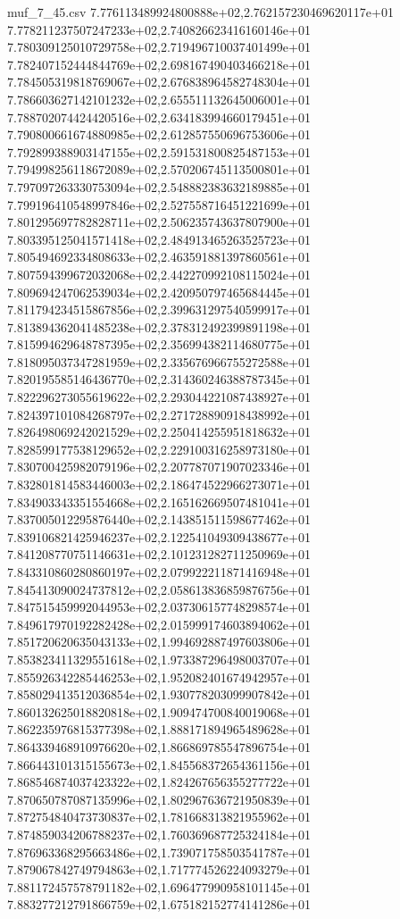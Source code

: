 \begin{filecontents*}{muf_7_45.csv}
7.776113489924800888e+02,2.762157230469620117e+01
7.778211237507247233e+02,2.740826623416160146e+01
7.780309125010729758e+02,2.719496710037401499e+01
7.782407152444844769e+02,2.698167490403466218e+01
7.784505319818769067e+02,2.676838964582748304e+01
7.786603627142101232e+02,2.655511132645006001e+01
7.788702074424420516e+02,2.634183994660179451e+01
7.790800661674880985e+02,2.612857550696753606e+01
7.792899388903147155e+02,2.591531800825487153e+01
7.794998256118672089e+02,2.570206745113500801e+01
7.797097263330753094e+02,2.548882383632189885e+01
7.799196410548997846e+02,2.527558716451221699e+01
7.801295697782828711e+02,2.506235743637807900e+01
7.803395125041571418e+02,2.484913465263525723e+01
7.805494692334808633e+02,2.463591881397860561e+01
7.807594399672032068e+02,2.442270992108115024e+01
7.809694247062539034e+02,2.420950797465684445e+01
7.811794234515867856e+02,2.399631297540599917e+01
7.813894362041485238e+02,2.378312492399891198e+01
7.815994629648787395e+02,2.356994382114680775e+01
7.818095037347281959e+02,2.335676966755272588e+01
7.820195585146436770e+02,2.314360246388787345e+01
7.822296273055619622e+02,2.293044221087438927e+01
7.824397101084268797e+02,2.271728890918438992e+01
7.826498069242021529e+02,2.250414255951818632e+01
7.828599177538129652e+02,2.229100316258973180e+01
7.830700425982079196e+02,2.207787071907023346e+01
7.832801814583446003e+02,2.186474522966273071e+01
7.834903343351554668e+02,2.165162669507481041e+01
7.837005012295876440e+02,2.143851511598677462e+01
7.839106821425946237e+02,2.122541049309438677e+01
7.841208770751146631e+02,2.101231282711250969e+01
7.843310860280860197e+02,2.079922211871416948e+01
7.845413090024737812e+02,2.058613836859876756e+01
7.847515459992044953e+02,2.037306157748298574e+01
7.849617970192282428e+02,2.015999174603894062e+01
7.851720620635043133e+02,1.994692887497603806e+01
7.853823411329551618e+02,1.973387296498003707e+01
7.855926342285446253e+02,1.952082401674942957e+01
7.858029413512036854e+02,1.930778203099907842e+01
7.860132625018820818e+02,1.909474700840019068e+01
7.862235976815377398e+02,1.888171894965489628e+01
7.864339468910976620e+02,1.866869785547896754e+01
7.866443101315155673e+02,1.845568372654361156e+01
7.868546874037423322e+02,1.824267656355277722e+01
7.870650787087135996e+02,1.802967636721950839e+01
7.872754840473730837e+02,1.781668313821955962e+01
7.874859034206788237e+02,1.760369687725324184e+01
7.876963368295663486e+02,1.739071758503541787e+01
7.879067842749794863e+02,1.717774526224093279e+01
7.881172457578791182e+02,1.696477990958101145e+01
7.883277212791866759e+02,1.675182152774141286e+01

\end{filecontents*}
